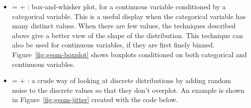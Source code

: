 \begin{itemize}
  \item {} =  + : box-and-whisker plot, for a continuous variable conditioned by a categorical variable.  This is a useful display when the categorical variable has many distinct values.  When there are few values, the techniques described above give a better view of the shape of the distribution.  This technique can also be used for continuous variables, if they are first finely binned.   Figure~\ref{fig:geom-boxplot} shows boxplots conditioned on both categorical and continuous variables.     
  
    
  
  \item {} =  + : a crude way of looking at discrete distributions by adding random noise to the discrete values so that they don't overplot.  An example is shown in Figure~\ref{fig:geom-jitter} created with the code below.     
  
    
  

\end{itemize}
